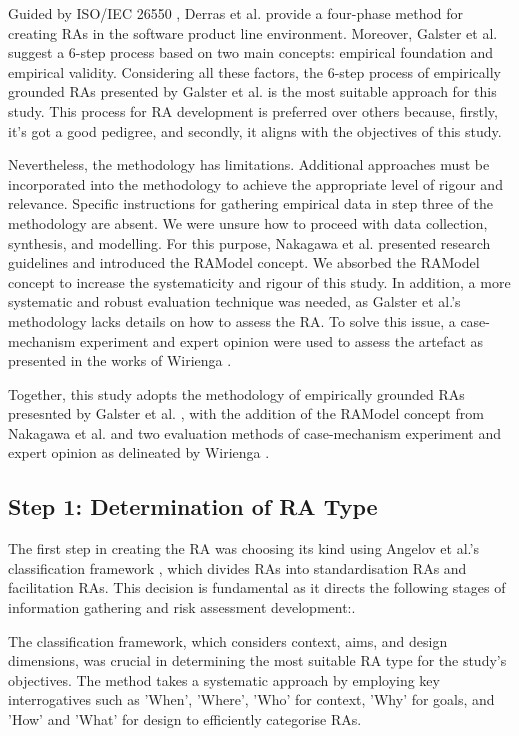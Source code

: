 \documentclass{ieeeaccess}
\begin{document}
Guided by ISO/IEC 26550 \cite{wg2015iso}, Derras et al. \cite{Derras} provide a four-phase method for creating RAs in the software product line environment. Moreover, Galster et al. \cite{GALSTER2011Empirically} suggest a 6-step process based on two main concepts: empirical foundation and empirical validity. Considering all these factors, the 6-step process of empirically grounded RAs presented by Galster et al. is the most suitable approach for this study. This process for RA development is preferred over others because, firstly, it's got a good pedigree, and secondly, it aligns with the objectives of this study.

Nevertheless, the methodology has limitations. Additional approaches must be incorporated into the methodology to achieve the appropriate level of rigour and relevance. Specific instructions for gathering empirical data in step three of the methodology are absent. We were unsure how to proceed with data collection, synthesis, and modelling. For this purpose, Nakagawa et al. \cite{Nakagawa} presented research guidelines and introduced the RAModel concept. We absorbed the RAModel concept to increase the systematicity and rigour of this study. In addition, a more systematic and robust evaluation technique was needed, as Galster et al.'s methodology lacks details on how to assess the RA. To solve this issue, a case-mechanism experiment and expert opinion were used to assess the artefact as presented in the works of Wirienga \cite{wieringa2014design}.

Together, this study adopts the methodology of empirically grounded RAs presesnted by Galster et al. \cite{GALSTER2011Empirically}, with the addition of the RAModel concept from Nakagawa et al. \cite{nakagawa2012ramodel} and two evaluation methods of case-mechanism experiment and expert opinion as delineated by Wirienga \cite{wieringa2014design}. 

\subsection{Step 1: Determination of RA Type}

The first step in creating the RA was choosing its kind using Angelov et al.'s classification framework \cite{angelov2009classification}, which divides RAs into standardisation RAs and facilitation RAs. This decision is fundamental as it directs the following stages of information gathering and risk assessment development:. 

The classification framework, which considers context, aims, and design dimensions, was crucial in determining the most suitable RA type for the study's objectives. The method takes a systematic approach by employing key interrogatives such as 'When', 'Where', 'Who' for context, 'Why' for goals, and 'How' and 'What' for design to efficiently categorise RAs.
\end{document}

